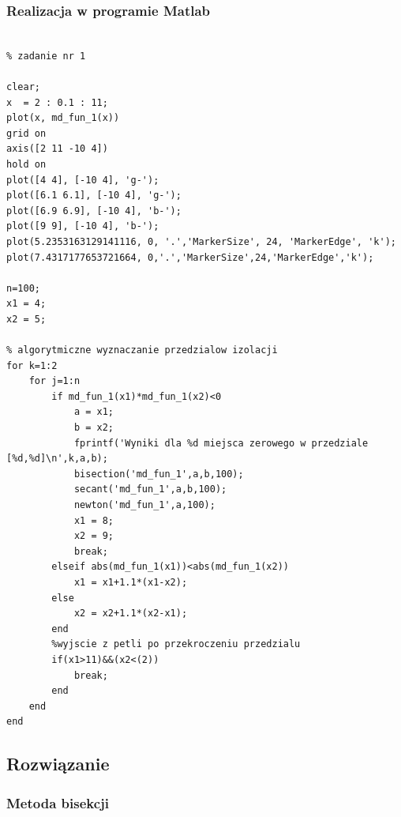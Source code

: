 \documentclass[11pt, oneside]{article}   	%
\begin{document}
\subsubsection{Realizacja w programie Matlab}
\begin{lstlisting}[caption=Skrypt rozwiązujący zadanie nr 1]

% zadanie nr 1

clear; 
x  = 2 : 0.1 : 11;
plot(x, md_fun_1(x))
grid on
axis([2 11 -10 4])
hold on
plot([4 4], [-10 4], 'g-');
plot([6.1 6.1], [-10 4], 'g-');
plot([6.9 6.9], [-10 4], 'b-');
plot([9 9], [-10 4], 'b-');
plot(5.2353163129141116, 0, '.','MarkerSize', 24, 'MarkerEdge', 'k');
plot(7.4317177653721664, 0,'.','MarkerSize',24,'MarkerEdge','k');

n=100; 
x1 = 4; 
x2 = 5; 

% algorytmiczne wyznaczanie przedzialow izolacji
for k=1:2
    for j=1:n
        if md_fun_1(x1)*md_fun_1(x2)<0
            a = x1;
            b = x2;
            fprintf('Wyniki dla %d miejsca zerowego w przedziale [%d,%d]\n',k,a,b);
            bisection('md_fun_1',a,b,100);
            secant('md_fun_1',a,b,100);
            newton('md_fun_1',a,100);
            x1 = 8; 
            x2 = 9; 
            break;
        elseif abs(md_fun_1(x1))<abs(md_fun_1(x2))
            x1 = x1+1.1*(x1-x2);
        else
            x2 = x2+1.1*(x2-x1);
        end
        %wyjscie z petli po przekroczeniu przedzialu
        if(x1>11)&&(x2<(2))
            break; 
        end
    end
end

\end{lstlisting}



\subsection{Rozwiązanie}
\subsubsection{Metoda bisekcji}
\end{document}
